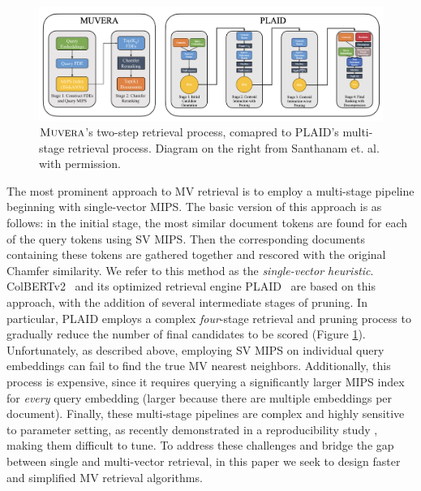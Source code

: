 \documentclass{article}
\newcommand{\name}{\textsc{Muvera}}
\begin{document}
\begin{figure}
\vspace{-2em}
    \centering
 \includegraphics[width = \textwidth]{plots/MAVEN_Diagrams.001.png}
    \caption{\small $\name$'s two-step retrieval process, comapred to PLAID's multi-stage retrieval process. Diagram on the right from Santhanam et. al. \cite{santhanam2022plaid} with permission.}
    \label{fig:MAVEN}
\end{figure}

 
 The most prominent approach to MV retrieval is to employ a multi-stage pipeline beginning with single-vector MIPS. The basic version of this approach is as follows: in the initial stage, the most similar document tokens are found for each of the query tokens using SV MIPS. Then the corresponding documents containing these tokens are gathered together and rescored with the original Chamfer similarity. We refer to this method as the \textit{single-vector heuristic}. 
 ColBERTv2~\cite{santhanam2021colbertv2} and its optimized retrieval engine PLAID~\cite{santhanam2022plaid}
 are based on this approach, with the addition of several intermediate stages of pruning. In particular, PLAID employs a complex \textit{four}-stage retrieval and pruning process to gradually reduce the number of final candidates to be scored (Figure \ref{fig:MAVEN}). Unfortunately, as described above, employing SV MIPS on individual query embeddings can fail to find the true MV nearest neighbors. Additionally, this process is expensive, since it requires querying a significantly larger MIPS index for \emph{every} query embedding (larger because there are multiple embeddings per document). 
 Finally, these multi-stage pipelines are complex and highly sensitive to parameter setting, as recently demonstrated in a reproducibility study \cite{macavaney2024reproducibility}, making them difficult to tune. To address these challenges
 and bridge the gap between single and multi-vector retrieval, 
 in this paper we seek to design faster and simplified MV retrieval algorithms.  
 
 
\end{document}
